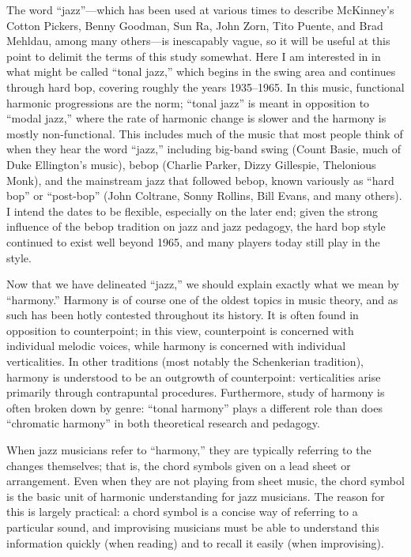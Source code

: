 \documentclass[diss]{subfiles}
\begin{document}
The word “jazz”---which has been used at various times to describe McKinney’s
Cotton Pickers, Benny Goodman, Sun Ra, John Zorn, Tito Puente, and Brad
Mehldau, among many others---is inescapably vague, so it will be useful at
this point to delimit the terms of this study somewhat. Here I am interested
in in what might be called “tonal jazz,” which begins in the swing area and
continues through hard bop, covering roughly the years 1935--1965. In this
music, functional harmonic progressions are the norm; “tonal jazz” is
meant in opposition to “modal jazz,” where the rate of harmonic change is
slower and the harmony is mostly non-functional. This includes much
of the music that most people think of when they hear the word “jazz,”
including big-band swing (Count Basie, much of Duke Ellington’s music), bebop
(Charlie Parker, Dizzy Gillespie, Thelonious Monk), and the mainstream jazz
that followed bebop, known variously as “hard bop” or “post-bop” (John
Coltrane, Sonny Rollins, Bill Evans, and many others). I intend the dates to
be flexible, especially on the later end; given the strong influence of the
bebop tradition on jazz and jazz pedagogy, the hard bop style continued to
exist well beyond 1965, and many players today still play in the
style.

Now that we have delineated “jazz,” we should explain exactly what we mean by
“harmony.” Harmony is of course one of the oldest topics in music theory, and
as such has been hotly contested throughout its history. It is often
found in opposition to counterpoint; in this view, counterpoint is concerned
with individual melodic voices, while harmony is concerned with individual
verticalities. In other traditions (most notably the Schenkerian tradition),
harmony is understood to be an outgrowth of counterpoint: verticalities arise
primarily through contrapuntal procedures. Furthermore, study of harmony is
often broken down by genre: “tonal harmony” plays a different role than does
“chromatic harmony” in both theoretical research and pedagogy.

When jazz musicians refer to “harmony,” they are typically referring to the
changes themselves; that is, the chord symbols given on a lead sheet or
arrangement. Even when they are not playing from sheet music, the chord symbol
is the basic unit of harmonic understanding for jazz musicians. The reason for
this is largely practical: a chord symbol is a concise way of referring to a
particular sound, and improvising musicians must be able to understand this
information quickly (when reading) and to recall it easily (when improvising).
\end{document}
